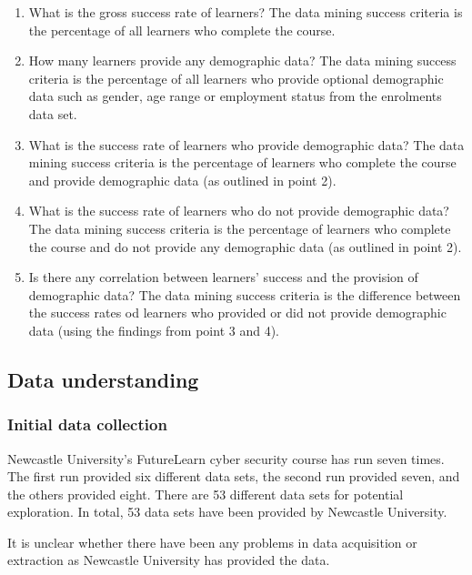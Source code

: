 \documentclass[
]{article}
\begin{document}
\begin{enumerate}
\def\labelenumi{\arabic{enumi}.}
\item
  What is the gross success rate of learners? The data mining success
  criteria is the percentage of all learners who complete the course.
\item
  How many learners provide any demographic data? The data mining
  success criteria is the percentage of all learners who provide
  optional demographic data such as gender, age range or employment
  status from the enrolments data set.
\item
  What is the success rate of learners who provide demographic data? The
  data mining success criteria is the percentage of learners who
  complete the course and provide demographic data (as outlined in point
  2).
\item
  What is the success rate of learners who do not provide demographic
  data? The data mining success criteria is the percentage of learners
  who complete the course and do not provide any demographic data (as
  outlined in point 2).
\item
  Is there any correlation between learners' success and the provision
  of demographic data? The data mining success criteria is the
  difference between the success rates od learners who provided or did
  not provide demographic data (using the findings from point 3 and 4).
\end{enumerate}

\hypertarget{data-understanding}{%
\subsection{Data understanding}\label{data-understanding}}

\hypertarget{initial-data-collection}{%
\subsubsection{Initial data collection}\label{initial-data-collection}}

Newcastle University's FutureLearn cyber security course has run seven
times. The first run provided six different data sets, the second run
provided seven, and the others provided eight. There are 53 different
data sets for potential exploration. In total, 53 data sets have been
provided by Newcastle University.

It is unclear whether there have been any problems in data acquisition
or extraction as Newcastle University has provided the data.
\end{document}
